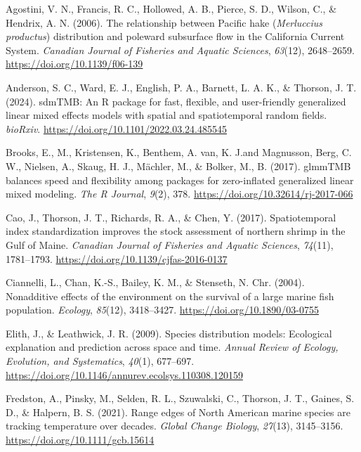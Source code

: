\documentclass[
]{article}
\newlength{\cslhangindent}
\newlength{\cslentryspacingunit} %
\newenvironment{CSLReferences}[2] %
 {%
  \setlength{\parindent}{0pt}
  \ifodd #1
  \let\oldpar\par
  \def\par{\hangindent=\cslhangindent\oldpar}
  \fi
  \setlength{\parskip}{#2\cslentryspacingunit}
 }%
 {}
\begin{document}
\hypertarget{refs}{}
\begin{CSLReferences}{1}{0}
\leavevmode{}%
Agostini, V. N., Francis, R. C., Hollowed, A. B., Pierce, S. D., Wilson,
C., \& Hendrix, A. N. (2006). {The relationship between Pacific hake
({\emph{Merluccius productus}}) distribution and poleward subsurface
flow in the California Current System}. \emph{Canadian Journal of
Fisheries and Aquatic Sciences}, \emph{63}(12), 2648--2659.
\url{https://doi.org/10.1139/f06-139}

\leavevmode{}%
Anderson, S. C., Ward, E. J., English, P. A., Barnett, L. A. K., \&
Thorson, J. T. (2024). {sdmTMB: An R package for fast, flexible, and
user-friendly generalized linear mixed effects models with spatial and
spatiotemporal random fields}. \emph{bioRxiv}.
\url{https://doi.org/10.1101/2022.03.24.485545}

\leavevmode{}%
Brooks, E., M., Kristensen, K., Benthem, A. van, K. J.and Magnusson,
Berg, C. W., Nielsen, A., Skaug, H. J., Mächler, M., \& Bolker, M., B.
(2017). {glmmTMB balances speed and flexibility among packages for
zero-inflated generalized linear mixed modeling}. \emph{The R Journal},
\emph{9}(2), 378. \url{https://doi.org/10.32614/rj-2017-066}

\leavevmode{}%
Cao, J., Thorson, J. T., Richards, R. A., \& Chen, Y. (2017).
{Spatiotemporal index standardization improves the stock assessment of
northern shrimp in the Gulf of Maine}. \emph{Canadian Journal of
Fisheries and Aquatic Sciences}, \emph{74}(11), 1781--1793.
\url{https://doi.org/10.1139/cjfas-2016-0137}

\leavevmode{}%
Ciannelli, L., Chan, K.-S., Bailey, K. M., \& Stenseth, N. Chr. (2004).
{Nonadditive effects of the environment on the survival of a large
marine fish population}. \emph{Ecology}, \emph{85}(12), 3418--3427.
\url{https://doi.org/10.1890/03-0755}

\leavevmode{}%
Elith, J., \& Leathwick, J. R. (2009). {Species distribution models:
Ecological explanation and prediction across space and time}.
\emph{Annual Review of Ecology, Evolution, and Systematics},
\emph{40}(1), 677--697.
\url{https://doi.org/10.1146/annurev.ecolsys.110308.120159}

\leavevmode{}%
Fredston, A., Pinsky, M., Selden, R. L., Szuwalski, C., Thorson, J. T.,
Gaines, S. D., \& Halpern, B. S. (2021). {Range edges of North American
marine species are tracking temperature over decades}. \emph{Global
Change Biology}, \emph{27}(13), 3145--3156.
\url{https://doi.org/10.1111/gcb.15614}


\end{CSLReferences}
\end{document}
